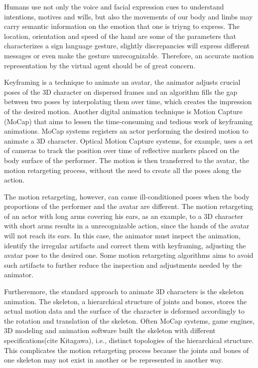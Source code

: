 \documentclass{vgtc}
\begin{document}
Humans use not only the voice and facial expression cues to understand
intentions, motives and wills, but also the movements of our body and
limbs may carry semantic information on the emotion that one is triyng
to express. The location, orientation and speed of the hand are some of
the parameters that characterizes a sign language gesture, slightly
discrepancies will express different messages or even make the gesture
unrecognizable. Therefore, an accurate motion representation by the
virtual agent should be of great concern.

Keyframing is a technique to animate an avatar, the animator adjusts
crucial poses of the 3D character on dispersed frames and an algorithm
fills the gap between two poses by interpolating them over time, which
creates the impression of the desired motion. Another digital animation
technique is Motion Capture (MoCap) that aims to lessen the
time-consuming and tedious work of keyframing animations. MoCap systems
registers an actor performing the desired motion to animate a 3D
character. Optical Motion Capture systems, for example, uses a set of
cameras to track the position over time of reflective markers placed on
the body surface of the performer. The motion is then transferred to the
avatar, the motion retargeting process, without the need to create all
the poses along the action.

The motion retargeting, however, can cause ill-conditioned poses when
the body proportions of the performer and the avatar are different. The
motion retargeting of an actor with long arms covering his ears, as an
example, to a 3D character with short arms results in a unrecognizable
action, since the hands of the avatar will not reach its ears. In this
case, the animator must inspect the animation, identify the irregular
artifacts and correct them with keyframing, adjusting the avatar pose to
the desired one. Some motion retargeting algorithms aims to avoid such
artifacts to further reduce the inspection and adjustments needed by the
animator.

Furtheremore, the standard approach to animate 3D characters is the
skeleton animation. The skeleton, a hierarchical structure of joints and
bones, stores the actual motion data and the surface of the character is
deformed accordingly to the rotation and translation of the skeleton.
Often MoCap systems, game engines, 3D modeling and animation software
built the skeleton with different specifications(cite Kitagawa), i.e.,
distinct topologies of the hierarchical structure. This complicates the
motion retargeting process because the joints and bones of one skeleton
may not exist in another or be represented in another way.
\end{document}
